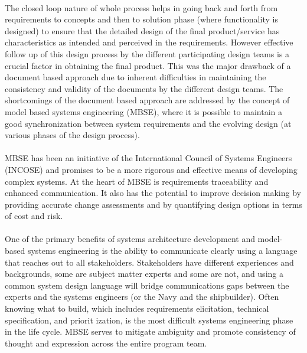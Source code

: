 \documentclass[a4paper,12pt,twoside]{report}
\begin{document}
{			\paragraph{} {The closed loop nature of whole process helps in going back and forth from requirements to concepts and then to solution phase (where functionality is designed) to ensure that the detailed design of the final product/service has characteristics as intended and perceived in the requirements. However effective follow up of this design process by the different participating design teams is a crucial factor in obtaining the final product. This was the major drawback of a document based  approach due to inherent difficulties in maintaining the consistency and validity of the documents by the different design teams. The shortcomings of the document based approach are addressed by the concept of model based systems engineering (MBSE), where it is possible to maintain a good synchronization between system requirements and the evolving design (at various phases of the design process). \cite{ModelBasedBMechatronisSysMLMatlab}
			}
			
			\paragraph{} {MBSE has been an initiative of the International Council of Systems Engineers (INCOSE) and promises to be a more rigorous and effective means of developing complex systems. At the heart of MBSE is requirements traceability and enhanced communication. It also has the potential to improve decision making by providing accurate change assessments and by quantifying design options in terms of cost and risk. \cite{MBSESystemArchitectureNavalShipDesign}
			}
			
			\paragraph{} {One of the primary benefits of systems architecture development and model-based systems engineering is the ability to communicate clearly using a language that reaches out to all stakeholders. Stakeholders have different experiences and backgrounds, some are subject matter experts and some are not, and using a common system design language will bridge communications gaps between the experts and the systems engineers (or the Navy and the shipbuilder). Often knowing what to build, which includes requirements elicitation, technical specification, and priorit ization, is the most difficult systems engineering phase in the life cycle. MBSE serves to mitigate ambiguity and promote consistency of thought and expression across the entire program team. \cite{MBSESystemArchitectureNavalShipDesign}
			}
									
}
\end{document}
